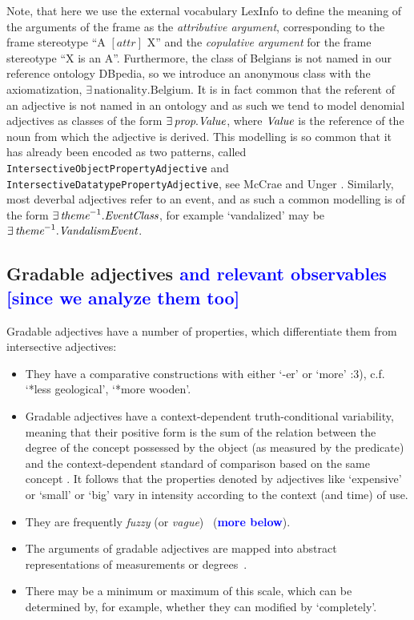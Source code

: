 \documentclass[11pt]{article}
\begin{document}
Note, that here we use the external vocabulary LexInfo \cite{cimiano2011lexinfo} 
to define the meaning of the arguments of the frame as the \emph{attributive 
argument}, corresponding to the frame stereotype ``A $[attr]$ X'' and the 
\emph{copulative argument} for the frame stereotype ``X is an A''. Furthermore,
the class of Belgians is not named in our reference ontology DBpedia, so we 
introduce an anonymous class with the axiomatization, 
$\exists\,\text{nationality}.\text{Belgium}$. It is in fact common that the 
referent of an adjective is not named in an ontology and as such we tend to 
model denomial adjectives as classes of the form $\exists\,\text{\em prop}.\text{\em Value}$, 
where $\text{\em Value}$ is the reference of the noun from which the adjective is
derived. This modelling is so common that it has already been encoded as two
patterns, called {\tt IntersectiveObjectPropertyAdjective} and {\tt
IntersectiveDatatypePropertyAdjective}, see McCrae and Unger .
Similarly, most deverbal adjectives refer to an event, and as such
a common modelling is of the form $\exists\,\text{\em theme}^{-1}.\text{\em EventClass}$, 
for example `vandalized' may be $\exists\,\text{\em theme}^{-1}.\text{\em VandalismEvent}$.

\subsection{Gradable adjectives \textcolor{blue}{and relevant observables [since we analyze them too]}}

Gradable adjectives have a number of properties, which differentiate them
from intersective adjectives:

\begin{itemize}
\item They have a comparative constructions with either `-er' or `more' \cite{kennedy1999scalar}:3), c.f. `*less geological', `*more wooden'.
\item Gradable adjectives have a context-dependent truth-conditional variability, meaning that their positive form is the sum of the relation between the degree of the concept possessed by the object (as measured by the predicate) and the context-dependent standard of comparison based on the same concept \cite{kennedy2007vagueness}. It follows that the properties denoted by adjectives like `expensive' or `small' or `big' vary in intensity according to the context (and time) of use. 
\item They are frequently \emph{fuzzy} (or \emph{vague})~\cite{kennedy2007vagueness} (\textbf{\textcolor{blue}{more below}}).
\item The arguments of gradable adjectives are mapped into abstract representations of measurements or degrees~\cite{kennedy2007vagueness}.
\item There may be a minimum or maximum of this scale, which can be determined
by, for example, whether they can modified by `completely'.
\end{itemize}
\end{document}
